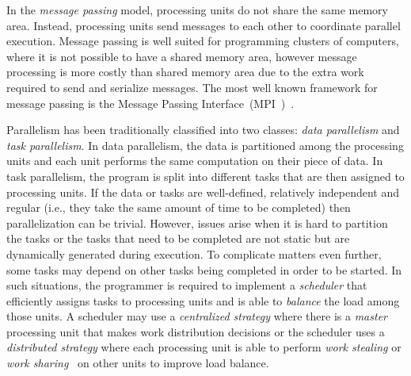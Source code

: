 In the \emph{message passing} model, processing units do not share the same
memory area. Instead, processing units send messages to each other to coordinate
parallel execution. Message passing is well suited for programming clusters of
computers, where it is not possible to have a shared memory area, however
message processing is more costly than shared memory area due to the extra work
required to send and serialize messages.  The most well known framework for
message passing is the Message Passing Interface~(MPI~)~\cite{Forum:1994}.

Parallelism has been traditionally classified into two classes: \emph{data
parallelism} and \emph{task parallelism}. In data parallelism, the data is
partitioned among the processing units and each unit performs the same
computation on their piece of data. In task parallelism, the program is split
into different tasks that are then assigned to processing units. If the data or
tasks are well-defined, relatively independent and regular (i.e., they take the
same amount of time to be completed) then parallelization can be trivial.
However, issues arise when it is hard to partition the tasks or the tasks that
need to be completed are not static but are dynamically generated during
execution. To complicate matters even further, some tasks may depend on other
tasks being completed in order to be started. In such situations, the programmer
is required to implement a \emph{scheduler} that efficiently assigns tasks to
processing units and is able to \emph{balance} the load among those units. A
scheduler may use a \emph{centralized strategy} where there is a \emph{master}
processing unit that makes work distribution decisions or the scheduler uses a
\emph{distributed strategy} where each processing unit is able to perform
\emph{work stealing} or \emph{work sharing}~\cite{Blumofe:1999} on other units
to improve load balance.
